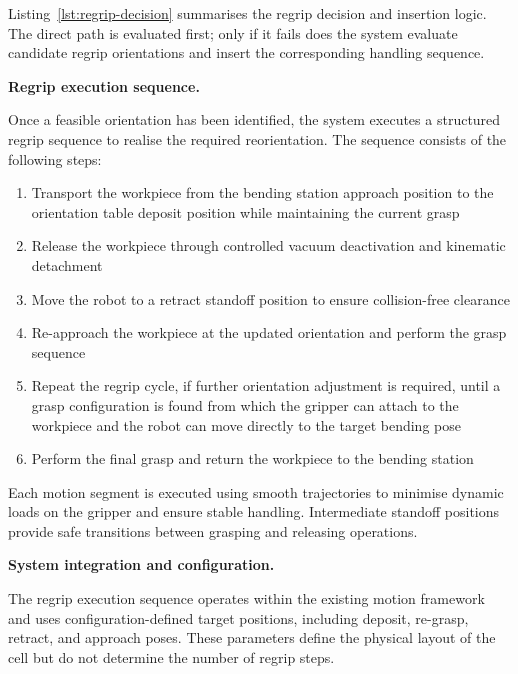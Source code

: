 Listing~\ref{lst:regrip-decision} summarises the regrip decision and insertion logic. The direct path is evaluated first; only if it fails does the system evaluate candidate regrip orientations and insert the corresponding handling sequence.



\label{sec:regrip-execution-sequence}
\noindent\textbf{Regrip execution sequence.}

Once a feasible orientation has been identified, the system executes a structured regrip sequence to realise the required reorientation. The sequence consists of the following steps:

\begin{enumerate}
\item Transport the workpiece from the bending station approach position to the orientation table deposit position while maintaining the current grasp
\item Release the workpiece through controlled vacuum deactivation and kinematic detachment
\item Move the robot to a retract standoff position to ensure collision-free clearance
\item Re-approach the workpiece at the updated orientation and perform the grasp sequence
\item Repeat the regrip cycle, if further orientation adjustment is required, until a grasp configuration is found from which the gripper can attach to the workpiece and the robot can move directly to the target bending pose
\item Perform the final grasp and return the workpiece to the bending station
\end{enumerate}

Each motion segment is executed using smooth trajectories to minimise dynamic loads on the gripper and ensure stable handling. Intermediate standoff positions provide safe transitions between grasping and releasing operations.

\label{sec:regrip-system-integration-configuration}
\noindent\textbf{System integration and configuration.}

The regrip execution sequence operates within the existing motion framework and uses configuration-defined target positions, including deposit, re-grasp, retract, and approach poses. These parameters define the physical layout of the cell but do not determine the number of regrip steps.

